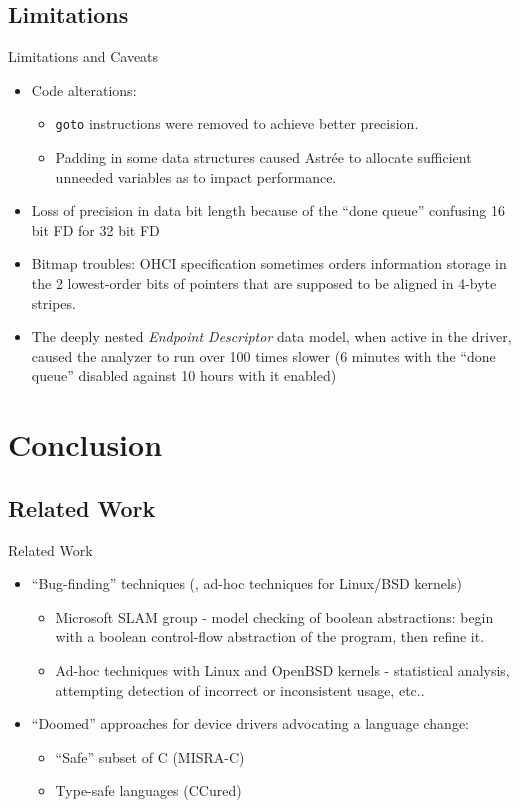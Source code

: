 \documentclass[aspectratio=169]{beamer}
\begin{document}
\subsection{Limitations}
\begin{frame}{Limitations and Caveats}
  \begin{itemize}
  \item Code alterations:
    \begin{itemize}
    \item \texttt{goto} instructions were removed to achieve better precision.
    \item Padding in some data structures caused Astrée to allocate sufficient unneeded variables as to impact performance.
    \end{itemize}
  \item Loss of precision in data bit length because of the ``done queue'' confusing 16 bit FD for 32 bit FD
  \item Bitmap troubles: OHCI specification sometimes orders information storage in the 2 lowest-order bits of pointers that are supposed to be aligned in 4-byte stripes.
  \item The deeply nested \textit{Endpoint Descriptor} data model, when active in the driver, caused the analyzer to run over 100 times slower (6 minutes with the ``done queue'' disabled against 10 hours with it enabled)
  \end{itemize}
\end{frame}

\section{Conclusion}

\subsection{Related Work}
\begin{frame}{Related Work}
  \begin{itemize}
  \item ``Bug-finding'' techniques (, ad-hoc techniques for Linux/BSD kernels)
    \begin{itemize}
    \item Microsoft SLAM group - model checking of boolean abstractions: begin with a boolean control-flow abstraction of the program, then refine it.
    \item Ad-hoc techniques with Linux and OpenBSD kernels - statistical analysis, attempting detection of incorrect or inconsistent usage, etc..
    \end{itemize}
  \item ``Doomed'' approaches for device drivers advocating a language change:
    \begin{itemize}
    \item ``Safe'' subset of C (MISRA-C)
    \item Type-safe languages (CCured)
    \end{itemize}
  \end{itemize}
\end{frame}
\end{document}
